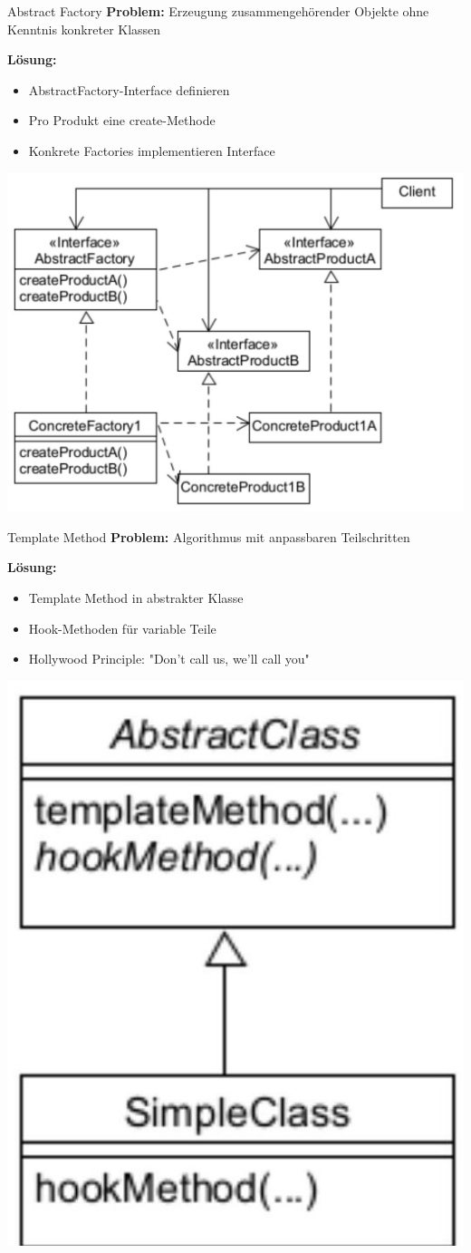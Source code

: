 \begin{definition}{Abstract Factory}
\textbf{Problem:} Erzeugung zusammengehörender Objekte ohne Kenntnis konkreter Klassen

\textbf{Lösung:}
\begin{itemize}
    \item AbstractFactory-Interface definieren
    \item Pro Produkt eine create-Methode
    \item Konkrete Factories implementieren Interface
\end{itemize}
\includegraphics[width=0.8\linewidth]{images/2025_01_02_73d93f10fa91ab6123dcg-13}
\end{definition}

\begin{definition}{Template Method}
\textbf{Problem:} Algorithmus mit anpassbaren Teilschritten

\textbf{Lösung:}
\begin{itemize}
    \item Template Method in abstrakter Klasse
    \item Hook-Methoden für variable Teile
    \item Hollywood Principle: "Don't call us, we'll call you"
\end{itemize}
\includegraphics[width=0.3\linewidth]{images/2025_01_02_73d93f10fa91ab6123dcg-22}
\end{definition}

